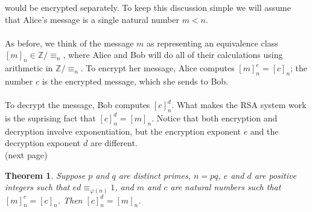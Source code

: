 \documentclass{report}
\newtheorem*{theorem}{Theorem}
\theoremstyle{definition}
\begin{document}
would be encrypted separately. To keep this discussion simple we will assume that Alice's message is a single natural number $m<n$.\\
\vspace{1mm}\\
As before, we think of the message $m$ as representing an equivalence class $[m]_n\in\mathbb Z/\equiv_n$, where Alice and Bob will do all of their
calculations using arithmetic in $\mathbb Z/\equiv_n$. To encrypt her message, Alice computes $[m]^e_n=[c]_n$; the number $c$ is the encrypted message, which she sends to Bob.\\
\vspace{1mm}\\
To decrypt the message, Bob computes $[c]^d_n$. What makes the RSA system work is the suprising fact that $[c]^d_n=[m]_n$. Notice that both 
encryption and decryption involve exponentiation, but the encryption
exponent $e$ and the decryption exponent $d$ are different.\\
(next page)\newpage
\begin{theorem}
Suppose $p$ and $q$ are distinct primes, $n=pq$, $e$ and $d$ are positive integers such that $ed\equiv_{\varphi(n)}1$, and $m$ and $c$ are natural
numbers such that $[m]^e_n=[c]_n$. Then $[c]^d_n=[m]_n$.
\end{theorem}
\end{document}
